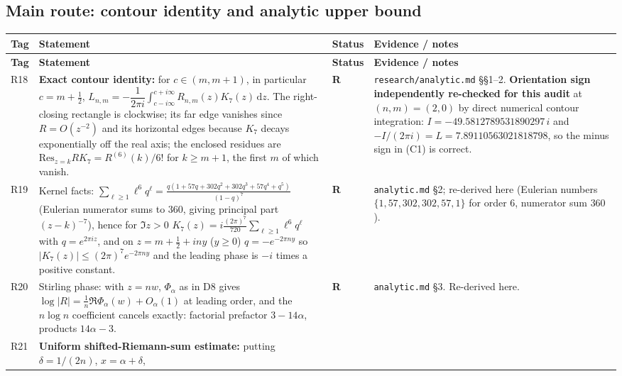 \documentclass[11pt]{article}
\newcommand{\stR}{\textcolor{okgreen}{\textbf{R}}}
\newcommand{\dd}{\,\mathrm{d}}
\begin{document}
\subsection{Main route: contour identity and analytic upper bound}

\begin{longtable}{@{}p{}p{}p{}p{}@{}}
\toprule \textbf{Tag} & \textbf{Statement} & \textbf{Status} & \textbf{Evidence / notes} \\ \midrule
\endfirsthead
\toprule \textbf{Tag} & \textbf{Statement} & \textbf{Status} & \textbf{Evidence / notes} \\ \midrule
\endhead
R18 & \textbf{Exact contour identity:} for $c\in(m,m+1)$, in particular $c=m+\tfrac12$,
      $L_{n,m}=-\dfrac{1}{2\pi i}\displaystyle\int_{c-i\infty}^{c+i\infty}R_{n,m}(z)K_7(z)\dd z$.
      The right-closing rectangle is clockwise; its far edge vanishes since $R=O(z^{-2})$ and its
      horizontal edges because $K_7$ decays exponentially off the real axis; the enclosed residues are
      $\mathrm{Res}_{z=k}RK_7=R^{(6)}(k)/6!$ for $k\ge m+1$, the first $m$ of which vanish. & \stR
      & \texttt{research/analytic.md} \S\S1--2. \textbf{Orientation sign independently re-checked for
      this audit} at $(n,m)=(2,0)$ by direct numerical contour integration: $I=-49.5812789531890297\,i$
      and $-I/(2\pi i)=L=7.89110563021818798$, so the minus sign in (C1) is correct. \\
R19 & Kernel facts: $\sum_{\ell\ge1}\ell^{6}q^{\ell}=\frac{q(1+57q+302q^{2}+302q^{3}+57q^{4}+q^{5})}{(1-q)^{7}}$
      (Eulerian numerator sums to $360$, giving principal part $(z-k)^{-7}$), hence for $\Im z>0$
      $K_7(z)=i\frac{(2\pi)^{7}}{720}\sum_{\ell\ge1}\ell^{6}q^{\ell}$ with $q=e^{2\pi iz}$, and on
      $z=m+\tfrac12+iny$ ($y\ge0$) $q=-e^{-2\pi ny}$ so $|K_7(z)|\le(2\pi)^{7}e^{-2\pi ny}$ and the
      leading phase is $-i$ times a positive constant. & \stR & \texttt{analytic.md} \S2;
      re-derived here (Eulerian numbers $\{1,57,302,302,57,1\}$ for order $6$, numerator sum $360$). \\
R20 & Stirling phase: with $z=nw$, $\Phi_\alpha$ as in D8 gives
      $\log|R|=\frac1n\Re\Phi_\alpha(w)+O_\alpha(1)$ at leading order, and the $n\log n$ coefficient
      cancels exactly: factorial prefactor $3-14\alpha$, products $14\alpha-3$. & \stR
      & \texttt{analytic.md} \S3. Re-derived here. \\
R21 & \textbf{Uniform shifted-Riemann-sum estimate:} putting $\delta=1/(2n)$, $x=\alpha+\delta$,

\end{longtable}
\end{document}

